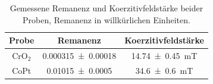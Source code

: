 \begin{table}[H]
	\centering
	\caption{Gemessene Remanenz und Koerzitivfeldstärke beider Proben, Remanenz in willkürlichen Einheiten.}
	\begin{tabular}{c| c | c}
		Probe & Remanenz & Koerzitivfeldstärke \\ \hline
    CrO$_2$ & \SI{0,000315+-0,00018}{} & \SI{14,74+-0,45}{mT} \\
    CoPt & \SI{0,01015+-0,0005}{}  & \SI{34,6+-0,6}{mT} \\
	\end{tabular}
	\label{tab:remko}
\end{table}
